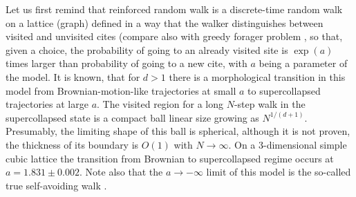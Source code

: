 \documentclass[aps,a4paper,twocolumn,showpacs]{revtex4}
\begin{document}
Let us first remind that reinforced random walk is a discrete-time random walk on a lattice (graph) defined in a way that the walker distinguishes between visited and unvisited cites \cite{sapozhnikov, ordemann1, ordemann2, foster} (compare also with greedy forager problem \cite{BhatRednerBenichou17}, so that, given a choice, the probability of going to an already visited site is $\exp(a)$ times larger than probability of going to a new cite, with $a$ being a parameter of the model. It is known, that for $d>1$ there is a morphological transition in this model from Brownian-motion-like trajectories at small $a$ to supercollapsed trajectories at large $a$. The visited region for a long $N$-step walk in the supercollapsed state is a compact ball linear size growing as $N^{1/(d+1)}$. Presumably, the limiting shape of this ball is spherical, although it is not proven, the thickness of its boundary is $O(1)$ with $N \to \infty$. On a 3-dimensional simple cubic lattice the transition from Brownian to supercollapsed regime occurs at $a = 1.831 \pm 0.002 $.  Note also that the $a\to -\infty$ limit of this model is the so-called true self-avoiding walk \cite{amit_parisi_peliti83}.
\end{document}
